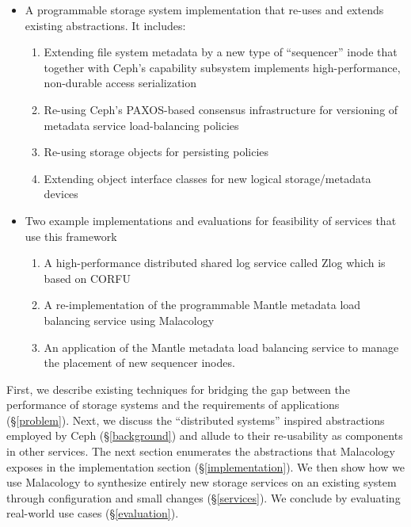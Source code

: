 \documentclass[10pt,twocolumn]{article}
\begin{document}
\begin{itemize}
\itemsep1pt\parskip0pt
\item A programmable storage system implementation that re-uses and extends existing abstractions. It includes:

  \begin{enumerate}
  \def\labelenumi{\arabic{enumi}.}
  \itemsep1pt\parskip0pt
  \item
    Extending file system metadata by a new type of ``sequencer'' inode that together with Ceph's capability subsystem implements high-performance, non-durable access serialization
  \item
    Re-using Ceph's PAXOS-based consensus infrastructure for versioning of metadata service load-balancing policies
  \item
    Re-using storage objects for persisting policies
  \item
    Extending object interface classes for new logical storage/metadata devices
  \end{enumerate}
\item
  Two example implementations and evaluations for feasibility of services that use this framework

  \begin{enumerate}
  \def\labelenumi{\arabic{enumi}.}
  \itemsep1pt\parskip0pt
  \item
    A high-performance distributed shared log service called Zlog which is based on CORFU~\cite{balakrishnan_corfu_2012}
  \item
    A re-implementation of the programmable Mantle metadata load balancing service using Malacology~\cite{sevilla:sc15-mantle}
  \item 
    An application of the Mantle metadata load balancing service to manage the placement of new sequencer inodes.
  \end{enumerate}
\end{itemize}

First, we describe existing techniques for bridging the gap between the
performance of storage systems and the requirements of applications
(\S\ref{problem}). Next, we discuss the ``distributed systems'' inspired
abstractions employed by Ceph (\S\ref{background}) and allude to their
re-usability as components in other services. The next section
enumerates the abstractions that Malacology exposes in the
implementation section (\S\ref{implementation}). We then show how we use
Malacology to synthesize entirely new storage services on an existing
system through configuration and small changes (\S\ref{services}). We
conclude by evaluating real-world use cases (\S\ref{evaluation}).
\end{document}
